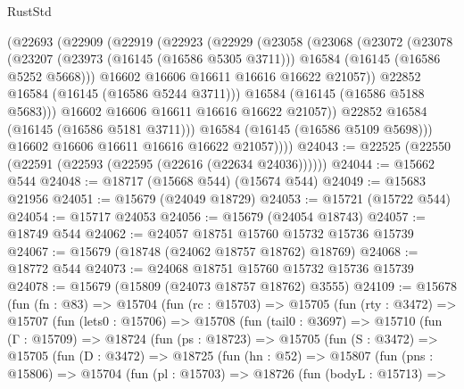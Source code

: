\begin{lexlean}{RustStd}
\begin{coremodule}
          (@22693
            (@22909
              (@22919
                (@22923
                  (@22929
                    (@23058
                      (@23068
                        (@23072
                          (@23078
                            (@23207
                              (@23973 (@16145 (@16586 @5305 @3711)))
                              @16584
                              (@16145 (@16586 @5252 @5668)))
                            @16602
                            @16606
                            @16611
                            @16616
                            @16622
                            @21057))
                        @22852
                        @16584
                        (@16145 (@16586 @5244 @3711)))
                      @16584
                      (@16145 (@16586 @5188 @5683)))
                    @16602
                    @16606
                    @16611
                    @16616
                    @16622
                    @21057))
                @22852
                @16584
                (@16145 (@16586 @5181 @3711)))
              @16584
              (@16145 (@16586 @5109 @5698)))
            @16602
            @16606
            @16611
            @16616
            @16622
            @21057))))
@24043 := @22525 (@22550 (@22591 (@22593 (@22595 (@22616 (@22634 @24036))))))
@24044 := @15662 @544
@24048 := @18717 (@15668 @544) (@15674 @544)
@24049 := @15683 @21956
@24051 := @15679 (@24049 @18729)
@24053 := @15721 (@15722 @544)
@24054 := @15717 @24053
@24056 := @15679 (@24054 @18743)
@24057 := @18749 @544
@24062 := @24057 @18751 @15760 @15732 @15736 @15739
@24067 := @15679 (@18748 (@24062 @18757 @18762) @18769)
@24068 := @18772 @544
@24073 := @24068 @18751 @15760 @15732 @15736 @15739
@24078 := @15679 (@15809 (@24073 @18757 @18762) @3555)
@24109 := @15678
    (fun (fn : @83) =>
    @15704
      (fun (rc : @15703) =>
      @15705
        (fun (rty : @3472) =>
        @15707
          (fun (lets0 : @15706) =>
          @15708
            (fun (tail0 : @3697) =>
            @15710
              (fun (Γ : @15709) =>
              @18724
                (fun (ps : @18723) =>
                @15705
                  (fun (S : @3472) =>
                  @15705
                    (fun (D : @3472) =>
                    @18725
                      (fun (hn : @52) =>
                      @15807
                        (fun (pns : @15806) =>
                        @15704
                          (fun (pl : @15703) =>
                          @18726
                            (fun (bodyL : @15713) =>

\end{coremodule}
\end{lexlean}
